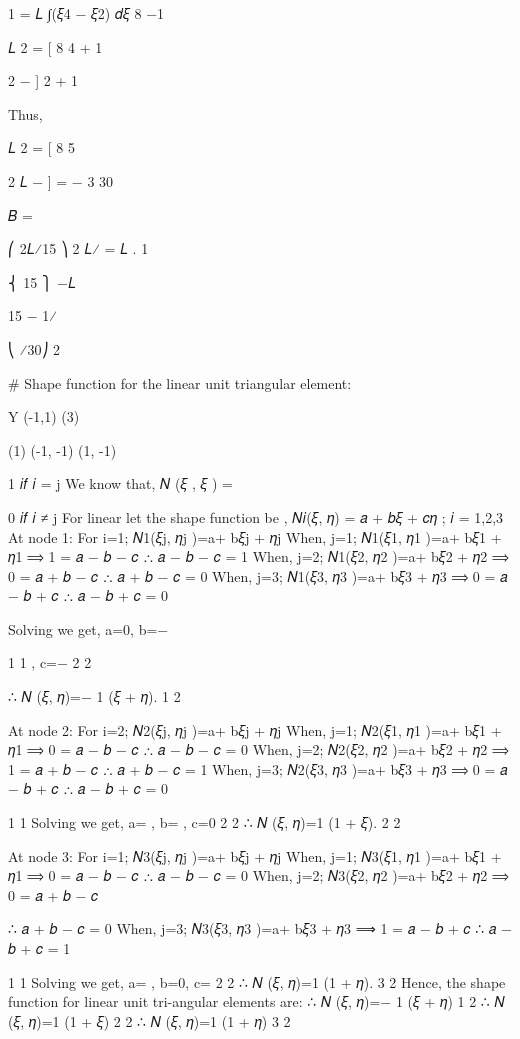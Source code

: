 {{{{{1
= 𝐿 ∫(𝜉4 − 𝜉2) 𝑑𝜉 8
−1

 
𝐿	2
=   [
8 4 + 1
 
2
−	]
2 + 1
 

 



Thus,
 
𝐿 2
=   [ 
8 5
 
2	𝐿
−  ] = −
3	30
 

 

{𝐵} =
 
⎛ 2𝐿⁄15 ⎞	2
𝐿⁄	=	𝐿 . {	1	}
 
⎨	15 ⎫
−𝐿
 
 
15	− 1⁄
 
⎝	⁄30⎠	2
 
# Shape function for the linear unit triangular element:


Y
(-1,1) (3)




(1)
(-1, -1)	(1, -1)


1 𝑖𝑓 𝑖 = j
We know that, 𝑁 (𝜉 , 𝜉 ) = {
0 𝑖𝑓 𝑖 ≠ j
For linear let the shape function be ,
𝑁𝑖(𝜉, 𝜂) = 𝑎 + 𝑏𝜉 + 𝑐𝜂 ; 𝑖 = 1,2,3
At node 1:
For i=1;	𝑁1(𝜉j, 𝜂j )=a+ b𝜉j + 𝜂j
When, j=1;	𝑁1(𝜉1, 𝜂1 )=a+ b𝜉1 + 𝜂1
⟹ 1 = 𝑎 − 𝑏 − 𝑐
∴ 𝑎 − 𝑏 − 𝑐 = 1
When, j=2;	𝑁1(𝜉2, 𝜂2 )=a+ b𝜉2 + 𝜂2
⟹ 0 = 𝑎 + 𝑏 − 𝑐
∴ 𝑎 + 𝑏 − 𝑐 = 0
When, j=3;	𝑁1(𝜉3, 𝜂3 )=a+ b𝜉3 + 𝜂3
⟹ 0 = 𝑎 − 𝑏 + 𝑐
∴ 𝑎 − 𝑏 + 𝑐 = 0

 
Solving we get, a=0, b=−
 
1	1
 , c=−  
2	2
 
∴ 𝑁 (𝜉, 𝜂)=− 1 (𝜉 + 𝜂).
1	2




At node 2:
For i=2;	𝑁2(𝜉j, 𝜂j )=a+ b𝜉j + 𝜂j
When, j=1;	𝑁2(𝜉1, 𝜂1 )=a+ b𝜉1 + 𝜂1
⟹ 0 = 𝑎 − 𝑏 − 𝑐
∴ 𝑎 − 𝑏 − 𝑐 = 0
When, j=2;	𝑁2(𝜉2, 𝜂2 )=a+ b𝜉2 + 𝜂2
⟹ 1 = 𝑎 + 𝑏 − 𝑐
∴ 𝑎 + 𝑏 − 𝑐 = 1
When, j=3;	𝑁2(𝜉3, 𝜂3 )=a+ b𝜉3 + 𝜂3
⟹ 0 = 𝑎 − 𝑏 + 𝑐
∴ 𝑎 − 𝑏 + 𝑐 = 0

1	1
Solving we get, a= , b= , c=0
2	2
∴ 𝑁 (𝜉, 𝜂)=1 (1 + 𝜉).
2	2


At node 3:
For i=1;	𝑁3(𝜉j, 𝜂j )=a+ b𝜉j + 𝜂j
When, j=1;	𝑁3(𝜉1, 𝜂1 )=a+ b𝜉1 + 𝜂1
⟹ 0 = 𝑎 − 𝑏 − 𝑐
∴ 𝑎 − 𝑏 − 𝑐 = 0
When, j=2;	𝑁3(𝜉2, 𝜂2 )=a+ b𝜉2 + 𝜂2
⟹ 0 = 𝑎 + 𝑏 − 𝑐
 
∴ 𝑎 + 𝑏 − 𝑐 = 0
When, j=3;	𝑁3(𝜉3, 𝜂3 )=a+ b𝜉3 + 𝜂3
⟹ 1 = 𝑎 − 𝑏 + 𝑐
∴ 𝑎 − 𝑏 + 𝑐 = 1

1	1
Solving we get, a= , b=0, c= 
2	2
∴ 𝑁 (𝜉, 𝜂)=1 (1 + 𝜂).
3	2
Hence, the shape function for linear unit tri-angular elements are:
∴ 𝑁 (𝜉, 𝜂)=− 1 (𝜉 + 𝜂)
1	2
∴ 𝑁 (𝜉, 𝜂)=1 (1 + 𝜉)
2	2
∴ 𝑁 (𝜉, 𝜂)=1 (1 + 𝜂)
3	2


}}}}}}
